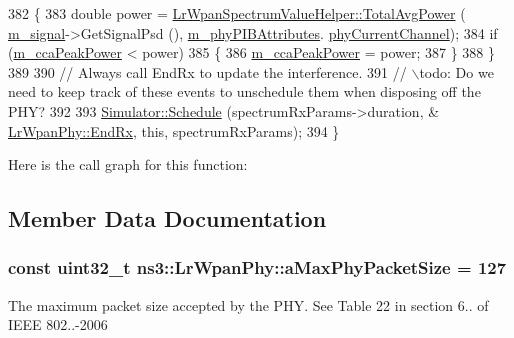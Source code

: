 \begin{DoxyCode}
382     \{
383       \textcolor{keywordtype}{double} power = \hyperlink{classns3_1_1LrWpanSpectrumValueHelper_ab8f05acfb68822f7b94fc637311fbda6}{LrWpanSpectrumValueHelper::TotalAvgPower} (
      \hyperlink{classns3_1_1LrWpanPhy_a923130b0bacef678012bcc8fdc68fd10}{m\_signal}->GetSignalPsd (), \hyperlink{classns3_1_1LrWpanPhy_a7f263bedbdeed627f7c5f2dab8e960c8}{m\_phyPIBAttributes}.
      \hyperlink{structns3_1_1LrWpanPhyPibAttributes_a8e620dfd0f5b45fa6c9525d93c498fcb}{phyCurrentChannel});
384       \textcolor{keywordflow}{if} (\hyperlink{classns3_1_1LrWpanPhy_a7b801d5943cf39ea427eb3cfd036166e}{m\_ccaPeakPower} < power)
385         \{
386           \hyperlink{classns3_1_1LrWpanPhy_a7b801d5943cf39ea427eb3cfd036166e}{m\_ccaPeakPower} = power;
387         \}
388     \}
389 
390   \textcolor{comment}{// Always call EndRx to update the interference.}
391   \textcolor{comment}{// \(\backslash\)todo: Do we need to keep track of these events to unschedule them when disposing off the PHY?}
392 
393   \hyperlink{classns3_1_1Simulator_a671882c894a08af4a5e91181bf1eec13}{Simulator::Schedule} (spectrumRxParams->duration, &
      \hyperlink{classns3_1_1LrWpanPhy_a3a6d92e9b81bb3209b990e6ab12f37b3}{LrWpanPhy::EndRx}, \textcolor{keyword}{this}, spectrumRxParams);
394 \}
\end{DoxyCode}


Here is the call graph for this function\+:




\subsection{Member Data Documentation}
\subsubsection[{\texorpdfstring{a\+Max\+Phy\+Packet\+Size}{aMaxPhyPacketSize}}]{\setlength{\rightskip}{0pt plus 5cm}const uint32\+\_\+t ns3\+::\+Lr\+Wpan\+Phy\+::a\+Max\+Phy\+Packet\+Size = 127\hspace{0.3cm}{\ttfamily [static]}}\hypertarget{classns3_1_1LrWpanPhy_a0dac53931aac7c959546ca54db5e39bb}{}\label{classns3_1_1LrWpanPhy_a0dac53931aac7c959546ca54db5e39bb}
The maximum packet size accepted by the P\+HY. See Table 22 in section 6.. of I\+E\+EE 802..-\/2006 
